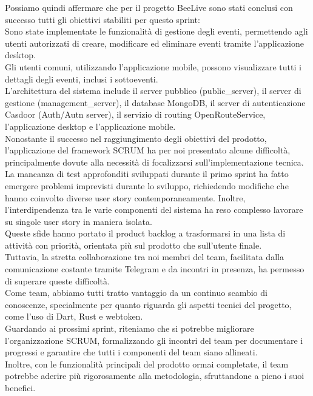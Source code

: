 \documentclass{article}
\begin{document}
Possiamo quindi affermare che per il progetto BeeLive sono stati conclusi con successo tutti gli obiettivi stabiliti per questo sprint:\\
Sono state implementate le funzionalità di gestione degli eventi, permettendo agli utenti autorizzati di creare, modificare ed eliminare eventi tramite l'applicazione desktop.\\
Gli utenti comuni, utilizzando l'applicazione mobile, possono visualizzare tutti i dettagli degli eventi, inclusi i sottoeventi.\\
L'architettura del sistema include il server pubblico (public\_server), il server di gestione (management\_server), il database MongoDB, il server di autenticazione Casdoor (Auth/Autn server), il servizio di routing OpenRouteService, l'applicazione desktop e l'applicazione mobile.\\

\noindent Nonostante il successo nel raggiungimento degli obiettivi del prodotto, l'applicazione del framework SCRUM ha per noi presentato alcune difficoltà, principalmente dovute alla necessità di focalizzarsi sull'implementazione tecnica.\\
La mancanza di test approfonditi sviluppati durante il primo sprint ha fatto emergere problemi imprevisti durante lo sviluppo, richiedendo modifiche che hanno coinvolto diverse user story contemporaneamente. Inoltre, l'interdipendenza tra le varie componenti del sistema ha reso complesso lavorare su singole user story in maniera isolata.\\
Queste sfide hanno portato il product backlog a trasformarsi in una lista di attività con priorità, orientata più sul prodotto che sull'utente finale.\\

\noindent Tuttavia, la stretta collaborazione tra noi membri del team, facilitata dalla comunicazione costante tramite Telegram e da incontri in presenza, ha permesso di superare queste difficoltà.\\
Come team, abbiamo tutti tratto vantaggio da un continuo scambio di conoscenze, specialmente per quanto riguarda gli aspetti tecnici del progetto, come l'uso di Dart, Rust e webtoken.\\

\noindent Guardando ai prossimi sprint, riteniamo che si potrebbe migliorare l'organizzazione SCRUM, formalizzando gli incontri del team per documentare i progressi e garantire che tutti i componenti del team siano allineati.\\
Inoltre, con le funzionalità principali del prodotto ormai completate, il team potrebbe aderire più rigorosamente alla metodologia, sfruttandone a pieno i suoi benefici.\\
\end{document}
